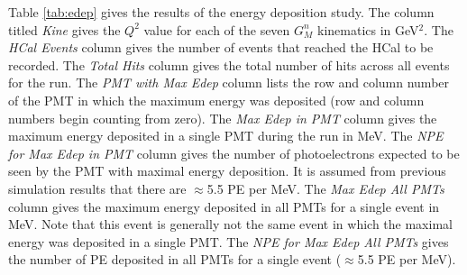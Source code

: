 \documentclass[10pt]{article}
\begin{document}
Table \ref{tab:edep} gives the results of the energy deposition study. The column titled \textit{Kine} gives the $Q^2$ value for each of the seven $G_M^n$ kinematics in GeV$^2$. The \textit{HCal Events} column gives the number of events that reached the HCal to be recorded. The \textit{Total Hits} column gives the total number of hits across all events for the run. The \textit{PMT with Max Edep} column lists the row and column number of the PMT in which the maximum energy was deposited (row and column numbers begin counting from zero). The \textit{Max Edep in PMT} column gives the maximum energy deposited in a single PMT during the run in MeV. The \textit{NPE for Max Edep in PMT} column gives the number of photoelectrons expected to be seen by the PMT with maximal energy deposition. It is assumed from previous simulation results that there are $\approx$5.5 PE per MeV. The \textit{Max Edep All PMTs} column gives the maximum energy deposited in all PMTs for a single event in MeV. Note that this event is generally not the same event in which the maximal energy was deposited in a single PMT. The \textit{NPE for Max Edep All PMTs} gives the number of PE deposited in all PMTs for a single event ($\approx$5.5 PE per MeV). 
\vspace{3mm}
\end{document}
